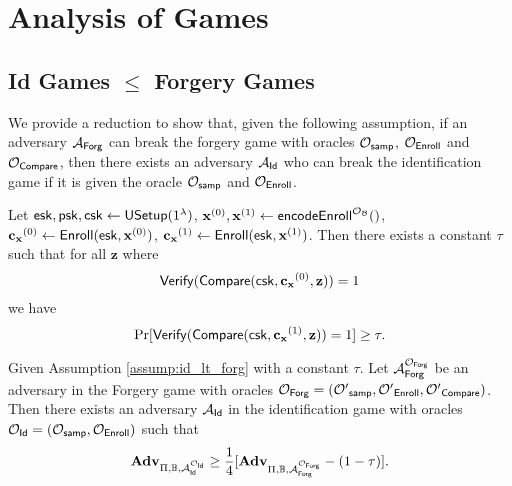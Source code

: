 \section{Analysis of Games}

\subsection{Id Games $\leq$ Forgery Games}

We provide a reduction to show that, given the following assumption, if an adversary $\mathcal{A}_{\sf Forg}$ can break the forgery game with oracles $\mathcal{O}_{\sf samp}$, $\mathcal{O}_{\sf Enroll}$ and $\mathcal{O}_{\sf Compare}$, then there exists an adversary $\mathcal{A}_{\sf Id}$ who can break the identification game if it is given the oracle $\mathcal{O}_{\sf samp}$ and $\mathcal{O}_{\sf Enroll}$.

\begin{assumption}
	\label{assump:id_lt_forg}
	Let ${\sf esk}, {\sf psk}, {\sf csk} \gets {\sf USetup}(1^\lambda)$, $\mathbf{x}^{(0)}, \mathbf{x}^{(1)} \gets {\sf encodeEnroll}^{\mathcal{O}_{\mathcal{B}}}()$, $\mathbf{c_x}^{(0)} \gets {\sf Enroll}({\sf esk}, \mathbf{x}^{(0)})$, $ \mathbf{c_x}^{(1)} \gets {\sf Enroll}({\sf esk}, \mathbf{x}^{(1)})$. Then there exists a constant $\tau$ such that for all $\mathbf{z}$ where
	\[
		{\sf Verify}( {\sf Compare}({\sf csk}, \mathbf{c_x}^{(0)}, \mathbf{z}) ) = 1
	\]
	we have
	\[
		\Pr[{\sf Verify}( {\sf Compare}({\sf csk}, \mathbf{c_x}^{(1)}, \mathbf{z}) ) = 1 ] \geq \tau.
	\]	

\end{assumption}

\begin{theorem}

	Given Assumption \ref{assump:id_lt_forg} with a constant $\tau$. Let $\mathcal{A}_{\sf Forg}^{\mathcal{O}_{\sf Forg}}$ be an adversary in the Forgery game with oracles $\mathcal{O}_{\sf Forg} = (\mathcal{O'}_{\sf samp}, \mathcal{O'}_{\sf Enroll}, \mathcal{O'}_{\sf Compare})$. Then there exists an adversary $\mathcal{A}_{\sf Id}$ in the identification game with oracles $\mathcal{O}_{\sf Id} = (\mathcal{O}_{\sf samp}, \mathcal{O}_{\sf Enroll})$ such that
	\[
		\mathbf{Adv}_{\Pi, \mathbb{B}, \mathcal{A}_{\sf Id}^{\mathcal{O}_{\sf Id}}} \geq \frac{1}{4} [ \mathbf{Adv}_{\Pi, \mathbb{B}, \mathcal{A}_{\sf Forg}^{\mathcal{O}_{\sf Forg}}}  - (1-\tau) ].
	\]

\end{theorem}

